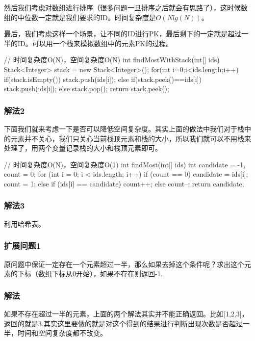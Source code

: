 然后我们考虑对数组进行排序（很多问题一旦排序之后就会有思路了），这时候数组的中位数一定就是我们要求的ID。时间复杂度是$O(Nlg(N))$。

最后，我们考虑这样一个场景，让不同的ID进行PK，最后剩下的一定就是超过一半的ID。可以用一个栈来模拟数组中的元素PK的过程。

\begin{Code}
// 时间复杂度O(N)，空间复杂度O(N)
int findMostWithStack(int[] ids) {
    Stack<Integer> stack = new Stack<Integer>();
    for(int i=0;i<ids.length;i++) {
        if(stack.isEmpty()) {
            stack.push(ids[i]);
        } else {
            if(stack.peek()==ids[i]) stack.push(ids[i]);
            else stack.pop();
        }
    }
    return stack.peek();
}
\end{Code}

\subsubsection{解法2}
下面我们就来考虑一下是否可以降低空间复杂度。其实上面的做法中我们对于栈中的元素并不关心，我们只关心当前栈顶元素和栈的大小，所以我们就可以不用栈来处理了，用两个变量记录栈的大小和栈顶元素即可。

\begin{Code}
// 时间复杂度O(N)，空间复杂度O(1)
int findMost(int[] ids) {
    int candidate = -1, count = 0;
    for (int i = 0; i < ids.length; i++) {
        if (count == 0) {
            candidate = ids[i];
            count = 1;
        } else {
            if (ids[i] == candidate) count++;
            else count--;
        }
    }
    return candidate;
}
\end{Code}

\subsubsection{解法3}
利用哈希表。


\subsubsection{扩展问题1}
原问题中保证一定存在一个元素超过一半，那么如果去掉这个条件呢？求出这个元素的下标（数组下标从0开始），如果不存在则返回-1.

\subsubsection{解法}
如果不存在超过一半的元素，上面的两个解法其实并不能正确返回。比如[1,2,3]，返回的就是3.其实这里要做的就是对这个得到的结果进行判断出现次数是否超过一半，时间和空间复杂度都不改变。

